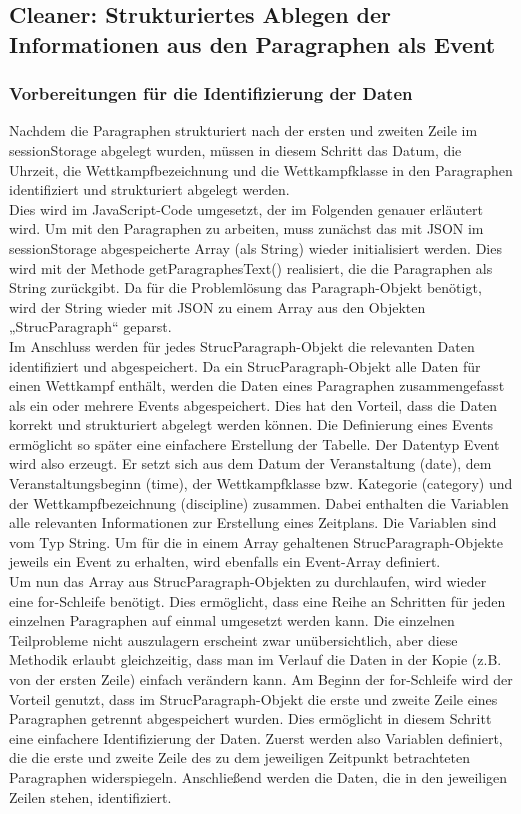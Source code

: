 {\subsection{Cleaner: Strukturiertes Ablegen der Informationen aus den Paragraphen als Event}

\subsubsection{Vorbereitungen für die Identifizierung der Daten}
Nachdem die Paragraphen strukturiert nach der ersten und zweiten Zeile im sessionStorage abgelegt wurden, müssen in diesem Schritt das Datum, die Uhrzeit, die Wettkampfbezeichnung und die Wettkampfklasse in den Paragraphen identifiziert und strukturiert abgelegt werden. \\
Dies wird im JavaScript-Code umgesetzt, der im Folgenden genauer erläutert wird. Um mit den Paragraphen zu arbeiten, muss zunächst das mit JSON im sessionStorage abgespeicherte Array (als String) wieder initialisiert werden. Dies wird mit der Methode getParagraphesText() realisiert, die die Paragraphen als String zurückgibt. Da für die Problemlösung das Paragraph-Objekt benötigt, wird der String wieder mit \ac{JSON} zu einem Array aus den Objekten „StrucParagraph“ geparst.\\
Im Anschluss werden für jedes StrucParagraph-Objekt die relevanten Daten identifiziert und abgespeichert. Da ein StrucParagraph-Objekt alle Daten für einen Wettkampf enthält, werden die Daten eines Paragraphen zusammengefasst als ein oder mehrere Events abgespeichert. Dies hat den Vorteil, dass die Daten korrekt und strukturiert abgelegt werden können. Die Definierung eines Events ermöglicht so später eine einfachere Erstellung der Tabelle. Der Datentyp Event wird also erzeugt. Er setzt sich aus dem Datum der Veranstaltung (date), dem Veranstaltungsbeginn (time), der Wettkampfklasse bzw. Kategorie (category) und der Wettkampfbezeichnung (discipline) zusammen. Dabei enthalten die Variablen alle relevanten Informationen zur Erstellung eines Zeitplans. Die Variablen sind vom Typ String. Um für die in einem Array gehaltenen StrucParagraph-Objekte jeweils ein Event zu erhalten, wird ebenfalls ein Event-Array definiert.\\
Um nun das Array aus StrucParagraph-Objekten zu durchlaufen, wird wieder eine for-Schleife benötigt. Dies ermöglicht, dass eine Reihe an Schritten für jeden einzelnen Paragraphen auf einmal umgesetzt werden kann. Die einzelnen Teilprobleme nicht auszulagern erscheint zwar unübersichtlich, aber diese Methodik erlaubt gleichzeitig, dass man im Verlauf die Daten in der Kopie (z.B. von der ersten Zeile) einfach verändern kann. 
Am Beginn der for-Schleife wird der Vorteil genutzt, dass im StrucParagraph-Objekt die erste und zweite Zeile eines Paragraphen getrennt abgespeichert wurden. Dies ermöglicht in diesem Schritt eine einfachere Identifizierung der Daten. Zuerst werden also Variablen definiert, die die erste und zweite Zeile des zu dem jeweiligen Zeitpunkt betrachteten Paragraphen widerspiegeln. Anschließend werden die Daten, die in den jeweiligen Zeilen stehen, identifiziert.

}
